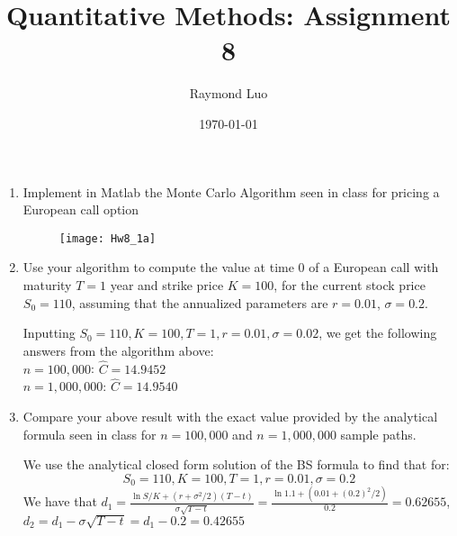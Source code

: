 \documentclass[12pt,twoside, letter]{exam}
\theoremstyle{definition}
\begin{document}
\abovedisplayskip=12pt
\belowdisplayskip=12pt
\abovedisplayshortskip=7pt
\belowdisplayshortskip=10pt
\allowdisplaybreaks

\setlength{\parindent}{18pt}

\title{Quantitative Methods: Assignment 8}
\author{Raymond Luo}
\date{\today}
\maketitle

  \begin{enumerate}
    \item Implement in Matlab the Monte Carlo Algorithm seen in class for pricing a European call option
      \begin{solution}
        \begin{figure}[H]
          \centering
            \texttt{[image: Hw8\_1a]}
        \end{figure}
      \end{solution}
    \item Use your algorithm to compute the value at time 0 of a European call with maturity $T = 1$ year and
      strike price $K = 100$, for the current stock price $S_0 = 110$, assuming that the annualized parameters are
      $r = 0.01$, $\sigma = 0.2$.
        \begin{solution}
          Inputting $S_0 = 110, K = 100, T = 1, r = 0.01, \sigma = 0.02$, we get the following answers from the algorithm above: \\
          $n = 100,000$: $\hat{C} = 14.9452$ \\
          $n = 1,000,000$: $\hat{C} = 14.9540$
        \end{solution}
    \item Compare your above result with the exact value provided by the analytical formula seen in class for
      $n = 100,000$ and $n = 1,000,000$ sample paths.
        \begin{solution}
          We use the analytical closed form solution of the BS formula to find that for:\\
          \begin{equation*}
            S_0 = 110, K = 100, T = 1, r = 0.01, \sigma = 0.2
          \end{equation*}
          We have that $d_1 = \frac{\ln{S/K} + (r + \sigma^2/2)(T-t)}{\sigma\sqrt{T-t}} = \frac{\ln{1.1} + (0.01 + (0.2)^2/2)}{0.2} = 0.62655$,
          $d_2 = d_1 - \sigma\sqrt{T-t} = d_1 - 0.2 = 0.42655$ \\

\end{solution}
\end{enumerate}
\end{document}
